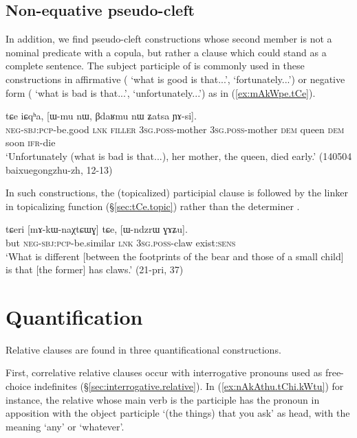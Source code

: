\subsection{Non-equative pseudo-cleft} \label{sec:pseudo.cleft2}
In addition, we find pseudo-cleft constructions whose second member is not a nominal predicate with a copula, but rather a clause which could stand as a complete sentence. The subject participle of  is commonly used in these constructions in affirmative ( `what is good is that...', `fortunately...') or negative form ( `what is bad is that...', `unfortunately...') as in (\ref{ex:mAkWpe.tCe}).

\begin{exe}
\ex \label{ex:mAkWpe.tCe}
\gll   [mɤ-kɯ-pe] tɕe iɕqʰa, [ɯ-mu nɯ, βdaʁmu nɯ ʑatsa ɲɤ-si].\\
\textsc{neg}-\textsc{sbj}:\textsc{pcp}-be.good \textsc{lnk} \textsc{filler} \textsc{3sg}.\textsc{poss}-mother  \textsc{3sg}.\textsc{poss}-mother \textsc{dem} queen \textsc{dem} soon \textsc{ifr}-die \\
\glt `Unfortunately (what is bad is that...), her mother, the queen, died early.' (140504 baixuegongzhu-zh, 12-13)
\end{exe}

In such constructions, the (topicalized) participial clause is followed by the linker  in topicalizing function (§\ref{sec:tCe.topic}) rather than the determiner .

\begin{exe}
\ex \label{ex:mAkWnaXtCWG.tCe}
\gll tɕeri [mɤ-kɯ-naχtɕɯɣ] tɕe, [ɯ-ndzrɯ ɣɤʑu].  \\
but \textsc{neg}-\textsc{sbj}:\textsc{pcp}-be.similar \textsc{lnk} \textsc{3sg}.\textsc{poss}-claw exist:\textsc{sens} \\
\glt `What is different [between the footprints of the bear and those of a small child] is that [the former] has claws.' (21-pri, 37)
\end{exe}

 
\section{Quantification} \label{sec:headless.relatives.quantification}
Relative clauses are found in three quantificational constructions. 

First, correlative relative clauses occur with interrogative pronouns used as free-choice indefinites (§\ref{sec:interrogative.relative}). In (\ref{ex:nAkAthu.tChi.kWtu}) for instance, the relative whose main verb is the participle  has the pronoun  in apposition with the object participle  `(the things) that you ask' as head, with the meaning `any' or `whatever'.

